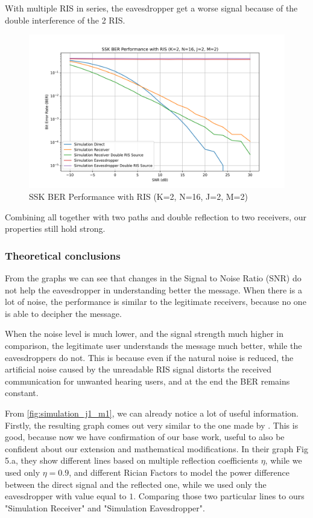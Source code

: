 With multiple RIS in series, the eavesdropper get a worse signal because of the double interference of the 2 RIS.

\begin{figure}[H]
  \centering
  \includegraphics[width=0.9\linewidth]{imgs/ber-simulations/SSK BER Performance with RIS (K=2, N=16, J=2, M=2).png}
  \caption{SSK BER Performance with RIS (K=2, N=16, J=2, M=2)}
  \label{fig:simulation_j2_m2}
\end{figure}

Combining all together with two paths and double reflection to two receivers, our properties still hold strong.

\subsubsection{Theoretical conclusions}

From the graphs we can see that changes in the Signal to Noise Ratio (SNR) do not help the eavesdropper in understanding better the message. When there is a lot of noise, the performance is similar to the legitimate receivers, because no one is able to decipher the message.

When the noise level is much lower, and the signal strength much higher in comparison, the legitimate user understands the message much better, while the eavesdroppers do not. This is because even if the natural noise is reduced, the artificial noise caused by the unreadable RIS signal distorts the received communication for unwanted hearing users, and at the end the BER remains constant.

From \ref{fig:simulation_j1_m1}, we can already notice a lot of useful information. Firstly, the resulting graph comes out very similar to the one made by \cite{9328149}. This is good, because now we have confirmation of our base work, useful to also be confident about our extension and mathematical modifications. In their graph Fig 5.a, they show different lines based on multiple reflection coefficients $\eta$, while we used only $\eta = 0.9$, and different Rician Factors to model the power difference between the direct signal and the reflected one, while we used only the eavesdropper with value equal to $1$. Comparing those two particular lines to ours "Simulation Receiver" and "Simulation Eavesdropper".

